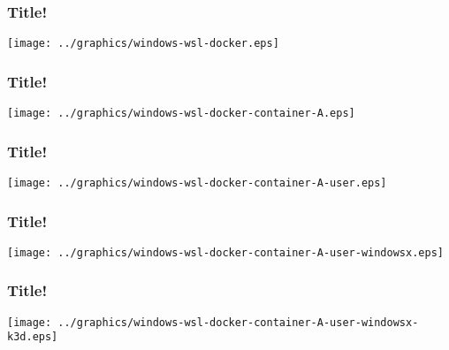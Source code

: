 \documentclass{beamer}
\begin{document}
    \begin{frame}
      \frametitle{Title!}
      \texttt{[image: ../graphics/windows-wsl-docker.eps]}
    \end{frame}

    \begin{frame}
      \frametitle{Title!}
      \texttt{[image: ../graphics/windows-wsl-docker-container-A.eps]}
    \end{frame}

    \begin{frame}
      \frametitle{Title!}
      \texttt{[image: ../graphics/windows-wsl-docker-container-A-user.eps]}
    \end{frame}

    \begin{frame}
      \frametitle{Title!}
      \texttt{[image: ../graphics/windows-wsl-docker-container-A-user-windowsx.eps]}
    \end{frame}

    \begin{frame}
      \frametitle{Title!}
      \texttt{[image: ../graphics/windows-wsl-docker-container-A-user-windowsx-k3d.eps]}
    \end{frame}
\end{document}
